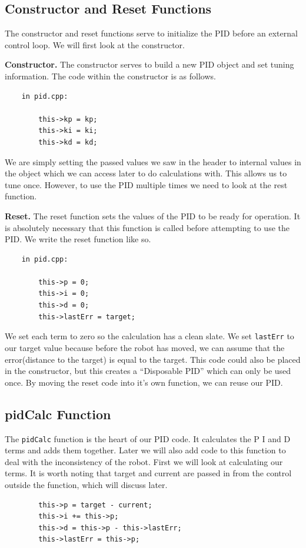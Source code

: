 \documentclass[12pt]{article}
\begin{document}
\subsection{Constructor and Reset Functions}
    The constructor and reset functions serve to initialize the PID before an external control loop. We will first look at the constructor.

    \textbf{Constructor.} The constructor serves to build a new PID object and set tuning information. The code within the constructor is as follows.

    \begin{verbatim}
    in pid.cpp:

        this->kp = kp;
        this->ki = ki;
        this->kd = kd;
    \end{verbatim}

    We are simply setting the passed values we saw in the header to internal values in the object which we can access later to do calculations with. This allows us to tune once. However, to use the PID multiple times we need to look at the rest function.

    \textbf{Reset.} The reset function sets the values of the PID to be ready for operation. It is absolutely necessary that this function is called before attempting to use the PID. We write the reset function like so.

    \begin{verbatim}
    in pid.cpp:

        this->p = 0;
        this->i = 0;
        this->d = 0;
        this->lastErr = target;
    \end{verbatim}

    We set each term to zero so the calculation has a clean slate. We set \verb|lastErr| to our target value because before the robot has moved, we can assume that the error(distance to the target) is equal to the target. This code could also be placed in the constructor, but this creates a ``Disposable PID'' which can only be used once. By moving the reset code into it's own function, we can reuse our PID.

\subsection{pidCalc Function}

    The \verb|pidCalc| function is the heart of our PID code. It calculates the P I and D terms and adds them together. Later we will also add code to this function to deal with the inconsistency of the robot. First we will look at calculating our terms. It is worth noting that target and current are passed in from the control outside the function, which will discuss later.
    \begin{verbatim}
        this->p = target - current;
        this->i += this->p;
        this->d = this->p - this->lastErr;
        this->lastErr = this->p;
    \end{verbatim}
\end{document}
